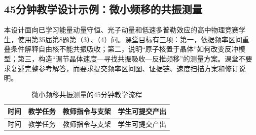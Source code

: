 \documentclass[
  12pt,
  a4paper,twoside,openany]{ctexbook}
\begin{document}
\subsection{45分钟教学设计示例：微小频移的共振测量}\label{ux5206ux949fux6559ux5b66ux8bbeux8ba1ux793aux4f8bux5faeux5c0fux9891ux79fbux7684ux5171ux632fux6d4bux91cf}

本设计面向已学习能量动量守恒、光子动量和低速多普勒效应的高中物理竞赛学生，使用第35届第8题第（3）、（4）问。课堂目标有三项：第一，依据频率区间重叠条件解释自由核不能共振吸收；第二，说明``原子核置于晶体''如何改变反冲模型；第三，构造``调节晶体速度---寻找共振吸收---反推频移''的测量方案。课堂不要求复述完整参考解答，而要求提交频率区间图、证据链、速度扫描方案和修订说明。

\begin{longtable}[]{@{}
  >{\raggedright\arraybackslash}p{}
  >{\raggedright\arraybackslash}p{}
  >{\raggedright\arraybackslash}p{}
  >{\raggedright\arraybackslash}p{}@{}}
\caption{微小频移共振测量的45分钟教学流程}\tabularnewline
\toprule\noalign{}
\rowcolor{ThesisPale}
\begin{minipage}[b]{\linewidth}\raggedright
时间
\end{minipage} & \begin{minipage}[b]{\linewidth}\raggedright
教学任务
\end{minipage} & \begin{minipage}[b]{\linewidth}\raggedright
教师指令与支架
\end{minipage} & \begin{minipage}[b]{\linewidth}\raggedright
学生可提交产出
\end{minipage} \\
\midrule\noalign{}
\endfirsthead
\toprule\noalign{}
\rowcolor{ThesisPale}
\begin{minipage}[b]{\linewidth}\raggedright
时间
\end{minipage} & \begin{minipage}[b]{\linewidth}\raggedright
教学任务
\end{minipage} & \begin{minipage}[b]{\linewidth}\raggedright
教师指令与支架
\end{minipage} & \begin{minipage}[b]{\linewidth}\raggedright
学生可提交产出
\end{minipage} \\

\end{longtable}
\end{document}
